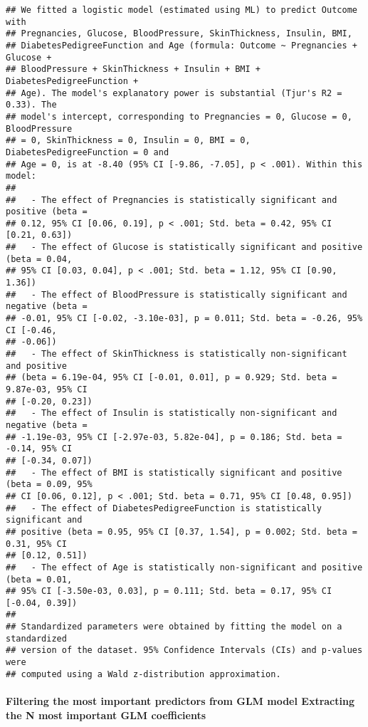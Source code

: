 \documentclass[
]{article}
\begin{document}
\begin{verbatim}
## We fitted a logistic model (estimated using ML) to predict Outcome with
## Pregnancies, Glucose, BloodPressure, SkinThickness, Insulin, BMI,
## DiabetesPedigreeFunction and Age (formula: Outcome ~ Pregnancies + Glucose +
## BloodPressure + SkinThickness + Insulin + BMI + DiabetesPedigreeFunction +
## Age). The model's explanatory power is substantial (Tjur's R2 = 0.33). The
## model's intercept, corresponding to Pregnancies = 0, Glucose = 0, BloodPressure
## = 0, SkinThickness = 0, Insulin = 0, BMI = 0, DiabetesPedigreeFunction = 0 and
## Age = 0, is at -8.40 (95% CI [-9.86, -7.05], p < .001). Within this model:
## 
##   - The effect of Pregnancies is statistically significant and positive (beta =
## 0.12, 95% CI [0.06, 0.19], p < .001; Std. beta = 0.42, 95% CI [0.21, 0.63])
##   - The effect of Glucose is statistically significant and positive (beta = 0.04,
## 95% CI [0.03, 0.04], p < .001; Std. beta = 1.12, 95% CI [0.90, 1.36])
##   - The effect of BloodPressure is statistically significant and negative (beta =
## -0.01, 95% CI [-0.02, -3.10e-03], p = 0.011; Std. beta = -0.26, 95% CI [-0.46,
## -0.06])
##   - The effect of SkinThickness is statistically non-significant and positive
## (beta = 6.19e-04, 95% CI [-0.01, 0.01], p = 0.929; Std. beta = 9.87e-03, 95% CI
## [-0.20, 0.23])
##   - The effect of Insulin is statistically non-significant and negative (beta =
## -1.19e-03, 95% CI [-2.97e-03, 5.82e-04], p = 0.186; Std. beta = -0.14, 95% CI
## [-0.34, 0.07])
##   - The effect of BMI is statistically significant and positive (beta = 0.09, 95%
## CI [0.06, 0.12], p < .001; Std. beta = 0.71, 95% CI [0.48, 0.95])
##   - The effect of DiabetesPedigreeFunction is statistically significant and
## positive (beta = 0.95, 95% CI [0.37, 1.54], p = 0.002; Std. beta = 0.31, 95% CI
## [0.12, 0.51])
##   - The effect of Age is statistically non-significant and positive (beta = 0.01,
## 95% CI [-3.50e-03, 0.03], p = 0.111; Std. beta = 0.17, 95% CI [-0.04, 0.39])
## 
## Standardized parameters were obtained by fitting the model on a standardized
## version of the dataset. 95% Confidence Intervals (CIs) and p-values were
## computed using a Wald z-distribution approximation.
\end{verbatim}

\hypertarget{filtering-the-most-important-predictors-from-glm-model-extracting-the-n-most-important-glm-coefficients}{%
\paragraph{Filtering the most important predictors from GLM model
Extracting the N most important GLM
coefficients}\label{filtering-the-most-important-predictors-from-glm-model-extracting-the-n-most-important-glm-coefficients}}
\end{document}
